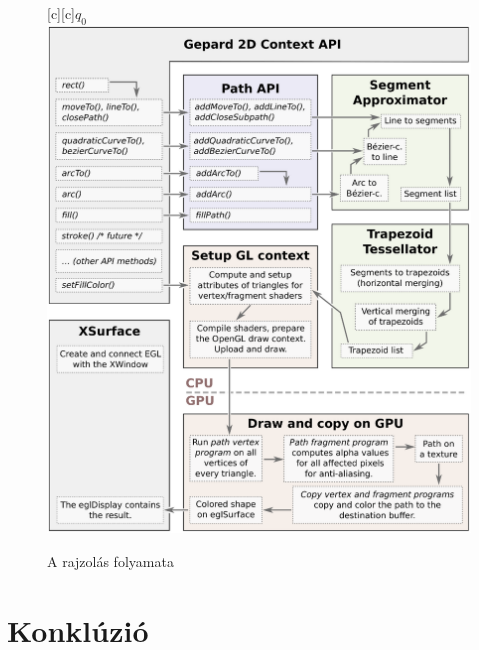 \documentclass[12pt]{report}
\theoremstyle{definition}
\begin{document}
    \begin{figure}[h]
    \centering
    [c][c]{$q_0$}
    \includegraphics[scale=0.6]{img/dataflow_eps}
    \caption{\label{dataflow-diagram} A rajzolás folyamata}
    \end{figure}



    \chapter{Konklúzió}



    {}
    
\end{document}

